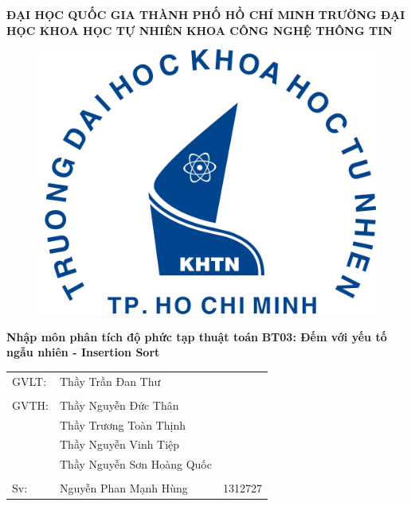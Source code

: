 \documentclass{article}
\begin{document}
\begin{titlepage}
\begin{center}
	\large{\textbf{ĐẠI HỌC QUỐC GIA THÀNH PHỐ HỒ CHÍ MINH}}
	\large{\textbf{TRƯỜNG ĐẠI HỌC KHOA HỌC TỰ NHIÊN}}
	\large{\textbf{KHOA CÔNG NGHỆ THÔNG TIN}}
	
	\begin{figure}[H]
		\centerline{\includegraphics[scale = 0.5]{logo}}
	\end{figure}

	\Large{\textbf{Nhập môn phân tích độ phức tạp thuật toán}}
	\Large{\textbf{BT03: Đếm với yếu tố ngẫu nhiên - Insertion Sort}}

\end{center}
	\vfill
\begin{flushright}
	
	\begin{tabular}{l l l}
		GVLT: &Thầy Trần Đan Thư\\
		&\\
		GVTH: &Thầy Nguyễn Đức Thân\\
		&Thầy Trương Toàn Thịnh\\
		&Thầy Nguyễn Vinh Tiệp\\
		&Thầy Nguyễn Sơn Hoàng Quốc\\
		&\\
		Sv: &Nguyễn Phan Mạnh Hùng & 1312727\\
	\end{tabular}
\end{flushright}

\vfill
\end{titlepage}
\pagebreak
\end{document}
